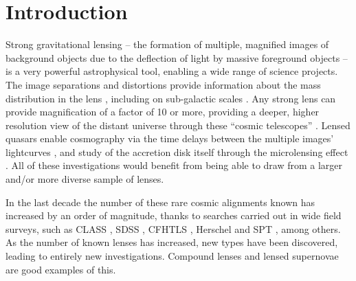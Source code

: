 \documentclass[useAMS,usenatbib,a4paper]{mn2e}
\begin{document}
\section{Introduction}
\label{sec:intro}


Strong gravitational lensing -- the formation of multiple, magnified images of
background objects due to the deflection of light by  massive foreground
objects -- is a very powerful astrophysical tool, enabling a wide range of
science projects. The image separations and distortions provide information
about the mass distribution in the lens \citep[e.g.][]{AugerEtal2010,
SonnenfeldEtal2012,MoreEtal2012,SonnenfeldEtal2013}, including on sub-galactic scales
\citep[e.g.][]{Dalal+Kochanek2002,VegettiEtal2010,HezavehEtal2013}. Any strong
lens can provide magnification of a factor of 10 or more, providing a deeper,
higher resolution view of the distant universe through these ``cosmic
telescopes'' \citep[e.g.][]{StarkEtal2008,NewtonEtal2011}. Lensed quasars
enable cosmography via the time delays between the multiple images'
lightcurves \citep[e.g.][]{TewesEtal2013,SuyuEtal2013}, and study of the
accretion disk itself through the microlensing effect
\citep[e.g.][]{PoindexterEtal2008}. All of these investigations would
benefit from being able to draw from a larger and/or more diverse sample of lenses.

In the last decade the number of these rare cosmic alignments known
has increased by an order of magnitude, thanks to searches carried out in
wide field surveys, such as
CLASS \citep[e.g.]{BrowneEtal2003}, SDSS \citep[e.g.][]
{BoltonEtal2006,AugerEtal2010b,TreuEtal2011,InadaEtal2012,SBAS,SGAS,CASSOWARY},
CFHTLS \citep[e.g.][]{MoreEtal2012,GavazziEtal2014}, Herschel
\citep[][]{NegrelloEtal2014} and SPT \citep[e.g.][]{VieiraEtal2013}, among
others.  As the number of known lenses has increased, new types have been
discovered, leading to entirely new investigations. Compound lenses
\citep{GavazziEtal2008,CollettEtal2012} and lensed supernovae
\citep{QuimbyEtal2014,KellyEtal2014} are good examples of this.

\end{document}
